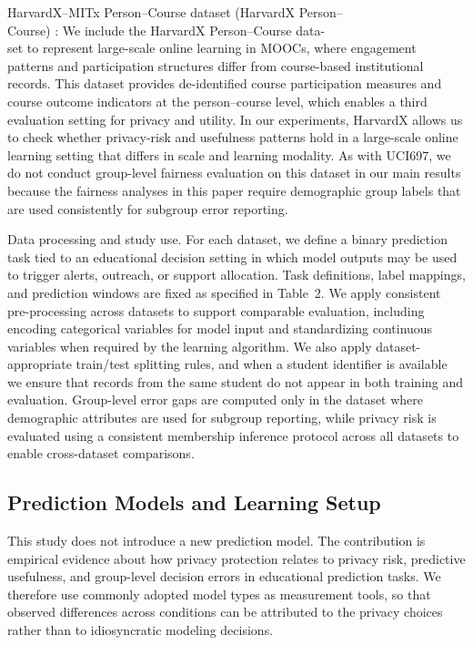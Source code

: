 \documentclass{edm_article}
\begin{document}
HarvardX–MITx Person–Course dataset (HarvardX Person–\\Course) \cite{32DVN_26147_2014}: We include the HarvardX Person–Course data-\\set to represent large-scale online learning in MOOCs, where engagement patterns and participation structures differ from course-based institutional records. This dataset provides de-identified course participation measures and course outcome indicators at the person–course level, which enables a third evaluation setting for privacy and utility. In our experiments, HarvardX allows us to check whether privacy-risk and usefulness patterns hold in a large-scale online learning setting that differs in scale and learning modality. As with UCI697, we do not conduct group-level fairness evaluation on this dataset in our main results because the fairness analyses in this paper require demographic group labels that are used consistently for subgroup error reporting.

Data processing and study use. For each dataset, we define a binary prediction task tied to an educational decision setting in which model outputs may be used to trigger alerts, outreach, or support allocation. Task definitions, label mappings, and prediction windows are fixed as specified in Table~2. We apply consistent pre-processing across datasets to support comparable evaluation, including encoding categorical variables for model input and standardizing continuous variables when required by the learning algorithm. We also apply dataset-appropriate train/test splitting rules, and when a student identifier is available we ensure that records from the same student do not appear in both training and evaluation. Group-level error gaps are computed only in the dataset where demographic attributes are used for subgroup reporting, while privacy risk is evaluated using a consistent membership inference protocol across all datasets to enable cross-dataset comparisons. 


\subsection{Prediction Models and Learning Setup}

This study does not introduce a new prediction model. The contribution is empirical evidence about how privacy protection relates to privacy risk, predictive usefulness, and group-level decision errors in educational prediction tasks. We therefore use commonly adopted model types as measurement tools, so that observed differences across conditions can be attributed to the privacy choices rather than to idiosyncratic modeling decisions.
\end{document}
